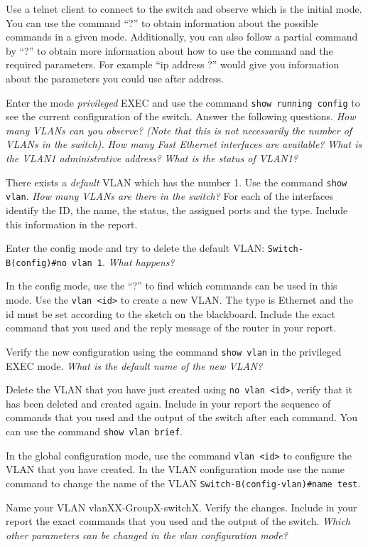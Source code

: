 Use a telnet client to connect to the switch and observe which is the initial mode.
You can use the command ``?'' to obtain information about the possible commands in a given mode.
Additionally, you can also follow a partial command by ``?'' to obtain more information about how to use the command and the required parameters.
For example ``ip address ?'' would give you information about the parameters you could use after address.

Enter the mode \emph{privileged} EXEC and use the command \texttt{show running config} to see the current configuration of the switch.
Answer the following questions.
\emph{How many VLANs can you observe? (Note that this is not necessarily the number of VLANs in the switch).}
\emph{How many Fast Ethernet interfaces are available?}
\emph{What is the VLAN1 administrative address?}
\emph{What is the status of VLAN1?}

There exists a \emph{default} VLAN which has the number 1.
Use the command \texttt{show vlan}.
\emph{How many VLANs are there in the switch?}
For each of the interfaces identify the ID, the name, the status, the assigned ports and the type.
Include this information in the report.

Enter the config mode and try to delete the default VLAN: 
\texttt{Switch-B(config)\#no vlan 1}.
\emph{What happens?}

In the config mode, use the ``?'' to find which commands can be used in this mode.
Use the \texttt{vlan <id>} to create a new VLAN.
The type is Ethernet and the id must be set according to the sketch on the blackboard.
Include the exact command that you used and the reply message of the router in your report.

Verify the new configuration using the command \texttt{show vlan} in the privileged EXEC mode.
\emph{What is the default name of the new VLAN?}

Delete the VLAN that you have just created using \texttt{no vlan <id>}, verify that it has been deleted and created again.
Include in your report the sequence of commands that you used and the output of the switch after each command.
You can use the command \texttt{show vlan brief}.

In the global configuration mode, use the command \texttt{vlan <id>} to configure the VLAN that you have created.
In the VLAN configuration mode use the name command to change the name of the VLAN \texttt{Switch-B(config-vlan)\#name test}.

Name your VLAN vlanXX-GroupX-switchX.
Verify the changes.
Include in your report the exact commands that you used and the output of the switch.
\emph{Which other parameters can be changed in the vlan configuration mode?}

